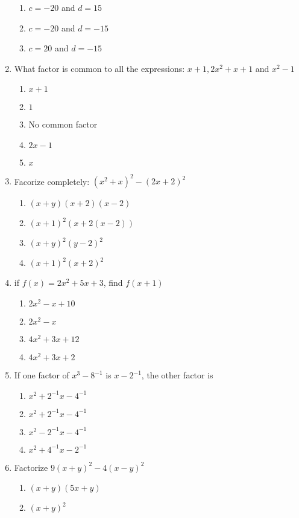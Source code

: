 \begin{multicols}{2}
\begin{enumerate}[label={\arabic*.}]
\begin{enumerate}[label={\Alph*.}]
	\item \(c=-20\) and \(d=15\)
	\item \(c=-20\) and \(d=-15\)
	\item \(c=20\) and \(d=-15\)
	\end{enumerate}
\item What factor is common to all the expressions: \(x+1, 2{x}^{2}+x+1\) and \({x}^{2}-1\)
	\begin{enumerate}[label={\Alph*.}]
	\item \(x+1\)
	\item \(1\)
	\item No common factor
	\item \(2x-1\)
	\item \(x\)
	\end{enumerate}
\item Facorize completely: \(({x}^{2}+x)^2-(2x+2)^2\)
	\begin{enumerate}[label={\Alph*.}]
	\item \((x+y)(x+2)(x-2)\)
	\item \((x+1)^2(x+2(x-2))\)
	\item \((x+y)^2(y-2)^2\)
	\item \((x+1)^2(x+2)^2\)
	\end{enumerate}
\item if \(f(x) = 2{x}^{2}+5x+3\), find \(f(x+1)\)
	\begin{enumerate}[label={\Alph*.}]
	\item \(2{x}^{2}-x+10\)
	\item \(2{x}^{2}-x\)
	\item \(4{x}^{2}+3x+12\)
	\item \(4{x}^{2}+3x+2\)
	\end{enumerate}
\item If one factor of \({x}^{3}-8^{-1}\) is \(x-2^{-1}\), the other factor is
	\begin{enumerate}[label={\Alph*.}]
	\item \({x}^{2}+2^{-1}x-4^{-1}\)
	\item \({x}^{2}+2^{-1}x-4^{-1}\)
	\item \({x}^{2}-2^{-1}x-4^{-1}\)
	\item \({x}^{2}+4^{-1}x-2^{-1}\)
	\end{enumerate}
\item Factorize \(9(x+y)^2 - 4(x-y)^2\)
	\begin{enumerate}[label={\Alph*.}]
	\item \((x+y)(5x+y)\)
	\item \((x+y)^2\)

\end{enumerate}
\end{enumerate}
\end{multicols}
